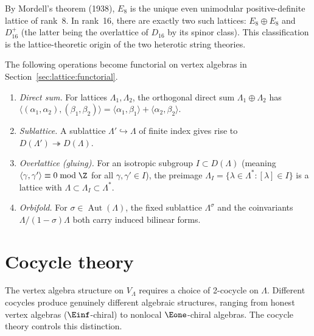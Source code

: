 \begin{remark}\label{rem:lattice:e8-unique}
By Mordell's theorem (1938), $E_8$ is the unique even unimodular
positive-definite lattice of rank~8. In rank~16, there are exactly two
such lattices: $E_8 \oplus E_8$ and $D_{16}^+$ (the latter being the
overlattice of $D_{16}$ by its spinor class). This classification is
the lattice-theoretic origin of the two heterotic string theories.
\end{remark}

\begin{definition}\label{def:lattice:operations}
The following operations become functorial on vertex algebras
in Section~\ref{sec:lattice:functorial}.
\begin{enumerate}[label=(\roman*)]
\item \emph{Direct sum.}
 For lattices $\Lambda_1, \Lambda_2$, the orthogonal direct sum
 $\Lambda_1 \oplus \Lambda_2$ has
 $\langle (\alpha_1, \alpha_2), (\beta_1, \beta_2) \rangle =
 \langle \alpha_1, \beta_1 \rangle + \langle \alpha_2, \beta_2 \rangle$.
\item \emph{Sublattice.}
 A sublattice $\Lambda' \hookrightarrow \Lambda$ of finite index
 gives rise to $D(\Lambda') \twoheadrightarrow D(\Lambda)$.
\item \emph{Overlattice (gluing).}
 For an isotropic subgroup $I \subset D(\Lambda)$ (meaning
 $\langle \gamma, \gamma' \rangle \equiv 0 \bmod \Z$ for all
 $\gamma, \gamma' \in I$), the preimage
 $\Lambda_I = \{\lambda \in \Lambda^* : [\lambda] \in I\}$ is a
 lattice with $\Lambda \subset \Lambda_I \subset \Lambda^*$.
\item \emph{Orbifold.}
 For $\sigma \in \operatorname{Aut}(\Lambda)$, the fixed sublattice
 $\Lambda^\sigma$ and the coinvariants $\Lambda/(1-\sigma)\Lambda$
 both carry induced bilinear forms.
\end{enumerate}
\end{definition}



\section{Cocycle theory}
\label{sec:lattice:cocycles}

The vertex algebra structure on $V_\Lambda$ requires a choice of
2-cocycle on $\Lambda$. Different cocycles produce genuinely different
algebraic structures, ranging from honest vertex algebras ($\Einf$-chiral)
to nonlocal $\Eone$-chiral algebras. The cocycle
theory controls this distinction.

